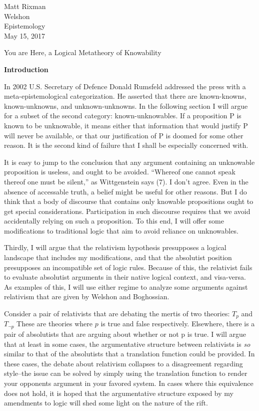 \documentclass[12pt]{article}
\begin{document}
\begin{flushleft}

Matt Rixman\\
Welshon\\
Epistemology\\
May 15, 2017\\


\begin{center}
    You are Here, a Logical Metatheory of Knowability
\end{center}

\textbf{Introduction}
\setlength{\parindent}{0.5in}


In 2002 U.S. Secretary of Defence Donald Rumsfeld addressed the press with a meta-epistemological categorization.
He asserted that there are known-knowns, known-unknowns, and unknown-unknowns.
In the following section I will argue for a subset of the second category: known-unknowables.
If a proposition P is known to be unknowable, it means either that information that would justify P will never be available\footnotemark, or that our justification of P is doomed for some other reason.
It is the second kind of failure that I shall be especially concerned with.

It is easy to jump to the conclusion that any argument containing an unknowable proposition is useless, and ought to be avoided.
``Whereof one cannot speak thereof one must be silent,'' as Wittgenstein says (7).
I don't agree.
Even in the absence of accessable truth, a belief might be useful for other reasons.
But I do think that a body of discourse that contains only knowable propositions ought to get special considerations.
Participation in such discourse requires that we avoid accidentally relying on such a proposition.
To this end, I will offer some modifications to traditional logic that aim to avoid reliance on unknowables.

Thirdly, I will argue that the relativism hypothesis presupposes a logical landscape that includes my modifications, and that the absolutist position presupposes an incompatible set of logic rules.
Because of this, the relativist fails to evaluate absolutist arguments in their native logical context, and visa-versa.
As examples of this, I will use either regime to analyze some arguments against relativism that are given by Welshon and Boghossian.

Consider a pair of relativists that are debating the mertis of two theories: $T_p$ and $T_{\neg p}$
These are theories where $p$ is true and false respectively.
Elsewhere, there is a pair of absolutists that are arguing about whether or not p is true.
I will argue that at least in some cases, the argumentative structure between relativists is \textit{so} similar to that of the absolutists that a translation function could be provided.
In these cases, the debate about relativism collapses to a disagreement regarding style--the issue can be solved by simply using the translation function to render your opponents argument in your favored system.
In cases where this equivalence does not hold, it is hoped that the argumentative structure exposed by my amendments to logic will shed some light on the nature of the rift.


\end{flushleft}
\end{document}
